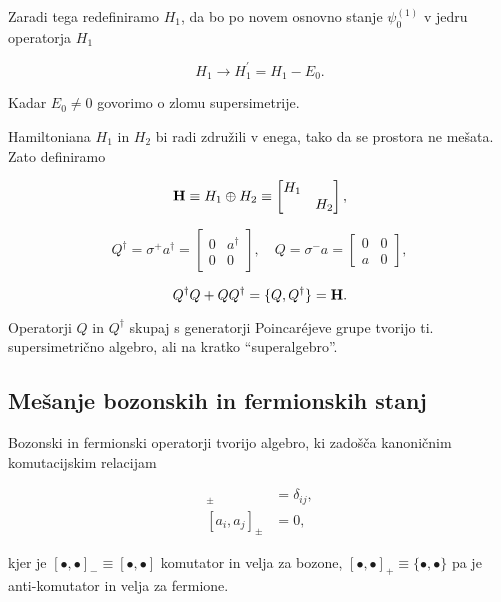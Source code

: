 \ni Zaradi tega redefiniramo $H_1$, da bo po novem osnovno stanje $\psi_0^{(1)}$ v jedru operatorja $H_1$

\begin{equation}
	H_1 \to H_1^\prime = H_1 - E_0.
\end{equation}

Kadar $E_0 \neq 0$ govorimo o zlomu supersimetrije.

Hamiltoniana $H_1$ in $H_2$ bi radi zdru\v zili v enega, tako da se prostora ne me\v sata. Zato
definiramo

\begin{equation}
	\mathbf{H} \equiv H_1 \oplus H_2 \equiv \begin{bmatrix}H_1 & \\
		& H_2 \end{bmatrix},
\end{equation}

\begin{equation}
	Q^\dagger = \sigma^+ a^\dagger = \begin{bmatrix} 0 & a^\dagger \\
		0 & 0 \end{bmatrix}, \quad
	Q = \sigma^- a = \begin{bmatrix} 0 & 0 \\
		a & 0 \end{bmatrix},
	\label{superop}
\end{equation}

\begin{equation}
	Q^\dagger Q + QQ^\dagger = \{Q, Q^\dagger\} = \mathbf{H}.
\end{equation}

Operatorji $Q$ in $Q^\dagger$ skupaj s generatorji Poincaréjeve grupe tvorijo ti. supersimetri\v cno algebro, ali
na kratko "`superalgebro"'.

\subsection{Me\v sanje bozonskih in fermionskih stanj}

Bozonski in fermionski operatorji tvorijo algebro, ki zado\v s\v ca kanoni\v cnim komutacijskim relacijam

\begin{align}
	[a_i, a_j^\dagger]_\pm &= \delta_{ij}, \\
	[a_i, a_j]_\pm &= 0,
\end{align}

\ni kjer je $[\bullet,\bullet]_- \equiv [\bullet,\bullet]$ komutator in velja za bozone,
$[\bullet,\bullet]_+ \equiv \{\bullet,\bullet\}$ pa je anti-komutator in velja za fermione.


